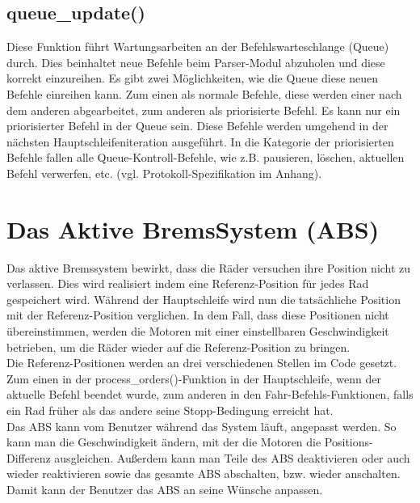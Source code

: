 \subsection{queue\_update()\label{chapter_queue_update}}
Diese Funktion führt Wartungsarbeiten an der Befehlswarteschlange (Queue) durch. Dies beinhaltet neue
Befehle beim Parser-Modul abzuholen und diese korrekt einzureihen. Es gibt zwei Möglichkeiten, wie die Queue
diese neuen Befehle einreihen kann. Zum einen als normale Befehle, diese werden einer nach dem anderen abgearbeitet,
zum anderen als priorisierte Befehl. Es kann nur ein priorisierter Befehl in der Queue sein. Diese Befehle werden
umgehend in der nächsten Haupt\-schleifen\-iteration ausgeführt. In die Kategorie der priorisierten Befehle fallen
alle Queue-Kontroll-Befehle, wie z.B. pausieren, löschen, aktuellen Befehl verwerfen, etc. (vgl. Protokoll-Spezifikation
im Anhang).
\section{Das Aktive BremsSystem (ABS)}
Das aktive Bremssystem bewirkt, dass die Räder versuchen ihre Position nicht zu verlassen. Dies wird realisiert indem
eine Referenz-Position für jedes Rad gespeichert wird. Während der Hauptschleife wird nun die tatsächliche Position mit
der Referenz-Position verglichen. In dem Fall, dass diese Positionen nicht übereinstimmen, werden die Motoren mit einer
einstellbaren Geschwindigkeit betrieben, um die Räder wieder auf die Referenz-Position zu bringen.\\
Die Referenz-Positionen werden an drei verschiedenen Stellen im Code gesetzt. Zum einen in der process\_\-orders()-Funktion
in der Hauptschleife, wenn der aktuelle Befehl beendet wurde, zum anderen in den Fahr-Befehls-Funktionen, falls ein Rad
früher als das andere seine Stopp-Bedingung erreicht hat.\\
Das ABS kann vom Benutzer während das System läuft, angepasst werden. So kann man die Geschwindigkeit ändern, mit der
die Motoren die Positions-Differenz ausgleichen. Außerdem kann man Teile des ABS deaktivieren oder auch wieder reaktivieren
sowie das gesamte ABS abschalten, bzw. wieder anschalten. Damit kann der Benutzer das ABS an seine Wünsche anpassen.
